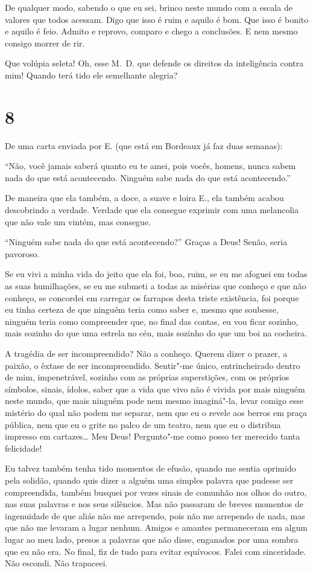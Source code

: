 De qualquer modo, sabendo o que eu sei, brinco neste mundo com a escala
de valores que todos acessam. Digo que isso é ruim e aquilo é bom. Que
isso é bonito e aquilo é feio. Admito e reprovo, comparo e chego a
conclusões. E nem mesmo consigo morrer de rir.

Que volúpia seleta! Oh, esse M.~D. que defende os direitos da
inteligência contra mim! Quando terá tido ele semelhante alegria?

\section{8}

De uma carta enviada por E. (que está em Bordeaux já faz duas semanas):

``Não, você jamais saberá quanto eu te amei, pois vocês, homens, nunca
sabem nada do que está acontecendo. Ninguém sabe nada do que está
acontecendo.''

De maneira que ela também, a doce, a suave e loira E., ela também acabou
descobrindo a verdade. Verdade que ela consegue exprimir com uma
melancolia que não vale um vintém, mas consegue.

``Ninguém sabe nada do que está acontecendo?'' Graças a Deus! Senão,
seria pavoroso.

Se eu vivi a minha vida do jeito que ela foi, boa, ruim, se eu me
afoguei em todas as suas humilhações, se eu me submeti a todas as
misérias que conheço e que não conheço, se concordei em carregar os
farrapos desta triste existência, foi porque eu tinha certeza de que
ninguém teria como saber e, mesmo que soubesse, ninguém teria como
compreender que, no final das contas, eu vou ficar sozinho, mais sozinho
do que uma estrela no céu, mais sozinho do que um boi na cocheira.

A tragédia de ser incompreendido? Não a conheço. Querem dizer o prazer,
a paixão, o êxtase de ser incompreendido. Sentir"-me único,
entrincheirado dentro de mim, impenetrável, sozinho com as próprias
superstições, com os próprios símbolos, sinais, ídolos, saber que a vida
que vivo não é vivida por mais ninguém neste mundo, que mais ninguém
pode nem mesmo imaginá"-la, levar comigo esse mistério do qual não podem
me separar, nem que eu o revele aos berros em praça pública, nem que eu
o grite no palco de um teatro, nem que eu o distribua impresso em
cartazes\ldots{} Meu Deus! Pergunto"-me como posso ter merecido tanta
felicidade!

Eu talvez também tenha tido momentos de efusão, quando me sentia
oprimido pela solidão, quando quis dizer a alguém uma simples palavra
que pudesse ser compreendida, também busquei por vezes sinais de
comunhão nos olhos do outro, nas suas palavras e nos seus silêncios. Mas
não passaram de breves momentos de ingenuidade de que aliás não me
arrependo, pois não me arrependo de nada, mas que não me levaram a lugar
nenhum. Amigos e amantes permaneceram em algum lugar ao meu lado, presos
a palavras que não disse, enganados por uma sombra que eu não era. No
final, fiz de tudo para evitar equívocos. Falei com sinceridade. Não
escondi. Não trapaceei.

